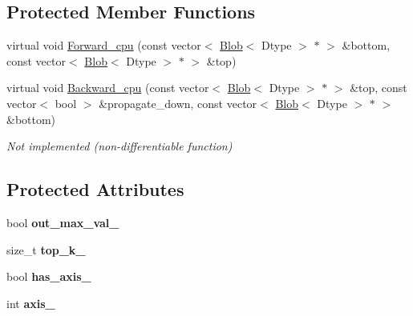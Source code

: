 \subsection*{Protected Member Functions}
\begin{DoxyCompactItemize}
\item 
virtual void \hyperlink{classcaffe_1_1ArgMaxLayer_a6446de6fbb3f4310229b188b08fe2698}{Forward\+\_\+cpu} (const vector$<$ \hyperlink{classcaffe_1_1Blob}{Blob}$<$ Dtype $>$ $\ast$ $>$ \&bottom, const vector$<$ \hyperlink{classcaffe_1_1Blob}{Blob}$<$ Dtype $>$ $\ast$ $>$ \&top)
\item 
virtual void \hyperlink{classcaffe_1_1ArgMaxLayer_a31cab0f0ea73c0df25c347c0923ea9a0}{Backward\+\_\+cpu} (const vector$<$ \hyperlink{classcaffe_1_1Blob}{Blob}$<$ Dtype $>$ $\ast$ $>$ \&top, const vector$<$ bool $>$ \&propagate\+\_\+down, const vector$<$ \hyperlink{classcaffe_1_1Blob}{Blob}$<$ Dtype $>$ $\ast$ $>$ \&bottom)\hypertarget{classcaffe_1_1ArgMaxLayer_a31cab0f0ea73c0df25c347c0923ea9a0}{}\label{classcaffe_1_1ArgMaxLayer_a31cab0f0ea73c0df25c347c0923ea9a0}

\begin{DoxyCompactList}\small\item\em Not implemented (non-\/differentiable function) \end{DoxyCompactList}\end{DoxyCompactItemize}
\subsection*{Protected Attributes}
\begin{DoxyCompactItemize}
\item 
bool {\bfseries out\+\_\+max\+\_\+val\+\_\+}\hypertarget{classcaffe_1_1ArgMaxLayer_a80166873c75bdbb9a8aaa43e63543684}{}\label{classcaffe_1_1ArgMaxLayer_a80166873c75bdbb9a8aaa43e63543684}

\item 
size\+\_\+t {\bfseries top\+\_\+k\+\_\+}\hypertarget{classcaffe_1_1ArgMaxLayer_a936d87cd98fe0c508f5d7feb17c5f989}{}\label{classcaffe_1_1ArgMaxLayer_a936d87cd98fe0c508f5d7feb17c5f989}

\item 
bool {\bfseries has\+\_\+axis\+\_\+}\hypertarget{classcaffe_1_1ArgMaxLayer_aad30a415d4d23ce890f9ddf0c7efcb4b}{}\label{classcaffe_1_1ArgMaxLayer_aad30a415d4d23ce890f9ddf0c7efcb4b}

\item 
int {\bfseries axis\+\_\+}\hypertarget{classcaffe_1_1ArgMaxLayer_af0c7ee3334644eef4b7d7d47cb5890a7}{}\label{classcaffe_1_1ArgMaxLayer_af0c7ee3334644eef4b7d7d47cb5890a7}

\end{DoxyCompactItemize}


